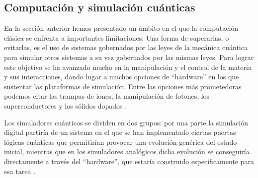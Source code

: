 \documentclass[a4paper,10pt]{article}
\begin{document}
\begin{multicols}{2}
\section{Computación y simulación cuánticas}
En la sección anterior hemos presentado un ámbito en el que la computación clásica se enfrenta a importantes limitaciones. Una forma de superarlas, o evitarlas, es el uso de sistemas gobernados por las leyes de la mecánica cuántica para simular otros sistemas a su vez gobernados por las mismas leyes. Para lograr este objetivo se ha avanzado mucho en la manipulación y el control de la materia y sus interacciones, dando lugar a muchos opciones de ``hardware'' en los que sustentar las plataformas de simulación. Entre las opciones más prometedoras podemos citar las trampas de iones, la manipulación de fotones, los superconductores y los sólidos dopados \cite{ladd_quantum_2010}.

Los simuladores cuánticos se dividen en dos grupos: por una parte la simulación digital partiría de un sistema en el que se han implementado ciertas puertas lógicas cuánticas que permitirían provocar una evolución genérica del estado inicial, mientras que en los simuladores analógicos dicha evolución se conseguiría directamente a través del ``hardware'', que estaría construido especificamente para esa tarea \cite{cirac_goals_2012}.


\end{multicols}
\end{document}
